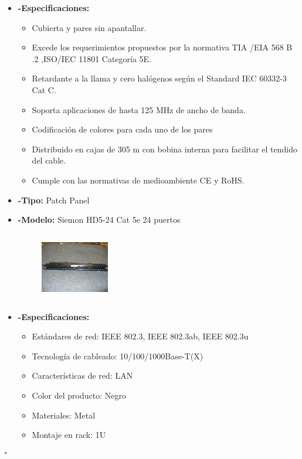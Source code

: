 \documentclass{udpreport}
\begin{document}
\begin{itemize}
\begin{figure}[h]
		\end{figure}\\ \\ \\ \\ \\
		\item{\bf-Especificaciones:}
		\begin{itemize}
			\item Cubierta y pares sin apantallar.\\
			\item Excede los requerimientos propuestos por la normativa TIA /EIA 568 B .2 ,ISO/IEC 11801 Categoría 5E.\\
			\item Retardante a la llama y cero halógenos según el Standard IEC 60332-3 Cat C.\\
			\item Soporta aplicaciones de hasta 125 MHz de ancho de banda.\\
			\item Codificación de colores para cada uno de los pares\\
			\item Distribuido en cajas de 305 m con bobina interna para facilitar el tendido del cable.\\
			\item Cumple con las normativas de medioambiente CE y RoHS.\\
		\end{itemize}
		\item{\bf-Tipo:} Patch Panel\\
		\item{\bf-Modelo:} Siemon HD5-24 Cat 5e 24 puertos\\
		\begin{figure}[h]
    		\centering
    	\includegraphics[width=3cm, height=3cm]{patchpanel.png}
		\end{figure}
		\item{\bf-Especificaciones:}
		\begin{itemize}
			\item Estándares de red: IEEE 802.3, IEEE 802.3ab, IEEE 802.3u\\
			\item Tecnología de cableado: 10/100/1000Base-T(X)\\
			\item Características de red: LAN\\
			\item Color del producto: Negro\\
			\item Materiales: Metal\\
			\item Montaje en rack: 1U\\
		\end{itemize}
	\end{itemize}"
\end{document}
